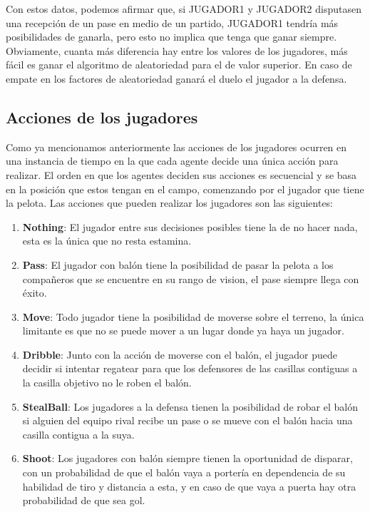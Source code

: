 \documentclass{article}
\begin{document}
Con estos datos, podemos afirmar que, si JUGADOR1 y JUGADOR2 disputasen una recepción de un pase en medio de un 
partido, JUGADOR1 tendría más posibilidades de ganarla, pero esto no implica que tenga que ganar siempre.
Obviamente, cuanta más diferencia hay entre los valores de los jugadores, más fácil es ganar el algoritmo de 
aleatoriedad para el de valor superior. En caso de empate en los factores de aleatoriedad ganará el duelo el 
jugador a la defensa.

\subsection{Acciones de los jugadores}

Como ya mencionamos anteriormente las acciones de los jugadores ocurren en una instancia de tiempo en la que cada agente decide 
una única acción para realizar. El orden en que los agentes deciden sus acciones es secuencial y se basa en la posición que estos tengan en el campo,
comenzando por el jugador que tiene la pelota. Las acciones que pueden realizar los jugadores son las siguientes:

\begin{enumerate}
      \item \textbf{Nothing}: El jugador entre sus decisiones posibles tiene la de no hacer nada, esta es la única que no resta estamina.
            
      \item \textbf{Pass}: El jugador con balón tiene la posibilidad de pasar la pelota a los compañeros que se encuentre en su rango de vision, el pase siempre llega con éxito.
            
      \item \textbf{Move}: Todo jugador tiene la posibilidad de moverse sobre el terreno, la única limitante es que no se puede mover a un lugar donde ya haya un jugador.
            
      \item \textbf{Dribble}: Junto con la acción de moverse con el balón, el jugador puede decidir si intentar regatear para que los defensores de las casillas contiguas a la casilla objetivo no le roben el balón.
            
      \item \textbf{StealBall}: Los jugadores a la defensa tienen la posibilidad de robar el balón si alguien del equipo rival recibe un pase  o se mueve con el balón hacia una casilla contigua a la suya.
            
      \item \textbf{Shoot}: Los jugadores con balón siempre tienen la oportunidad de disparar, con un probabilidad de que el balón vaya a portería en dependencia de su habilidad de tiro y distancia a esta, y en caso de que vaya a puerta hay otra probabilidad de que sea gol.
            
\end{enumerate}
\end{document}
